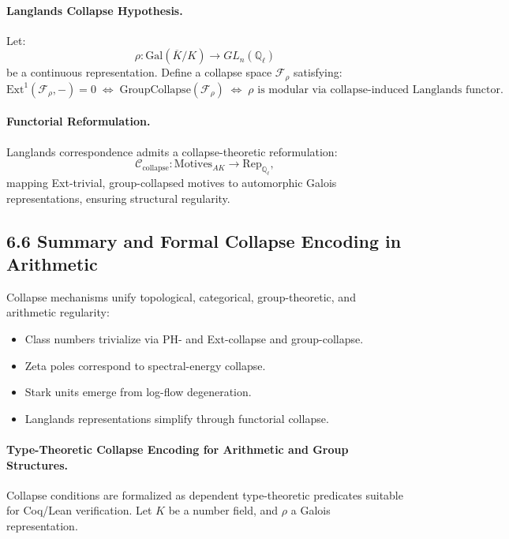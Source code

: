 \documentclass[11pt]{article}
\begin{document}
\paragraph{Langlands Collapse Hypothesis.}
Let:
\[
\rho: \mathrm{Gal}(\overline{K}/K) \to GL_n(\mathbb{Q}_\ell)
\]
be a continuous representation. Define a collapse space \( \mathcal{F}_\rho \) satisfying:
\[
\mathrm{Ext}^1(\mathcal{F}_\rho, -) = 0 \;\Leftrightarrow\; \text{GroupCollapse}(\mathcal{F}_\rho) \;\Leftrightarrow\; \rho \text{ is modular via collapse-induced Langlands functor}.
\]

\paragraph{Functorial Reformulation.}
Langlands correspondence admits a collapse-theoretic reformulation:
\[
\mathcal{C}_{\mathrm{collapse}}: \mathrm{Motives}_{AK} \longrightarrow \mathrm{Rep}_{\mathbb{Q}_\ell},
\]
mapping Ext-trivial, group-collapsed motives to automorphic Galois representations, ensuring structural regularity.

\subsection*{6.6 Summary and Formal Collapse Encoding in Arithmetic}

Collapse mechanisms unify topological, categorical, group-theoretic, and arithmetic regularity:

\begin{itemize}
    \item Class numbers trivialize via PH- and Ext-collapse and group-collapse.
    \item Zeta poles correspond to spectral-energy collapse.
    \item Stark units emerge from log-flow degeneration.
    \item Langlands representations simplify through functorial collapse.
\end{itemize}

\paragraph{Type-Theoretic Collapse Encoding for Arithmetic and Group Structures.}

Collapse conditions are formalized as dependent type-theoretic predicates suitable for Coq/Lean verification. Let \( K \) be a number field, and \( \rho \) a Galois representation.
\end{document}
